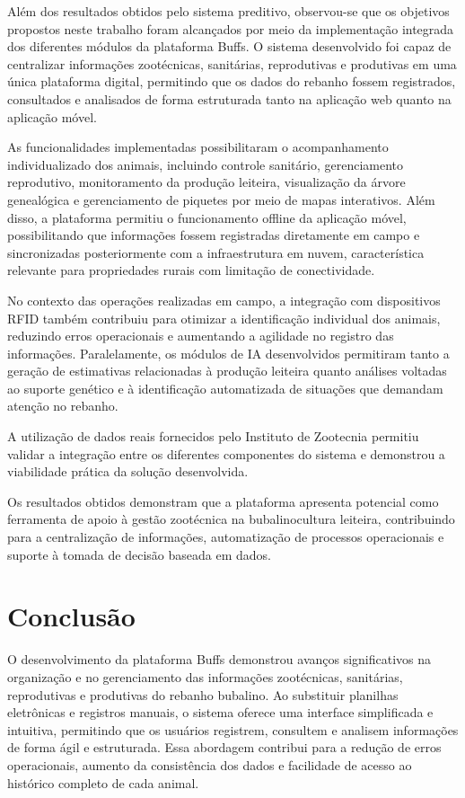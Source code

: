 \documentclass[11pt,a4paper]{article}
\begin{document}
Além dos resultados obtidos pelo sistema preditivo, observou-se que os objetivos propostos neste trabalho foram alcançados por meio da implementação integrada dos diferentes módulos da plataforma Buffs. O sistema desenvolvido foi capaz de centralizar informações zootécnicas, sanitárias, reprodutivas e produtivas em uma única plataforma digital, permitindo que os dados do rebanho fossem registrados, consultados e analisados de forma estruturada tanto na aplicação web quanto na aplicação móvel.

As funcionalidades implementadas possibilitaram o acompanhamento individualizado dos animais, incluindo controle sanitário, gerenciamento reprodutivo, monitoramento da produção leiteira, visualização da árvore genealógica e gerenciamento de piquetes por meio de mapas interativos. Além disso, a plataforma permitiu o funcionamento offline da aplicação móvel, possibilitando que informações fossem registradas diretamente em campo e sincronizadas posteriormente com a infraestrutura em nuvem, característica relevante para propriedades rurais com limitação de conectividade.

No contexto das operações realizadas em campo, a integração com dispositivos RFID também contribuiu para otimizar a identificação individual dos animais, reduzindo erros operacionais e aumentando a agilidade no registro das informações. Paralelamente, os módulos de IA desenvolvidos permitiram tanto a geração de estimativas relacionadas à produção leiteira quanto análises voltadas ao suporte genético e à identificação automatizada de situações que demandam atenção no rebanho.

A utilização de dados reais fornecidos pelo Instituto de Zootecnia permitiu validar a integração entre os diferentes componentes do sistema e demonstrou a viabilidade prática da solução desenvolvida.

Os resultados obtidos demonstram que a plataforma apresenta potencial como ferramenta de apoio à gestão zootécnica na bubalinocultura leiteira, contribuindo para a centralização de informações, automatização de processos operacionais e suporte à tomada de decisão baseada em dados.


\section{Conclusão}
O desenvolvimento da plataforma Buffs demonstrou avanços significativos na organização e no gerenciamento das informações zootécnicas, sanitárias, reprodutivas e produtivas do rebanho bubalino. Ao substituir planilhas eletrônicas e registros manuais, o sistema oferece uma interface simplificada e intuitiva, permitindo que os usuários registrem, consultem e analisem informações de forma ágil e estruturada. Essa abordagem contribui para a redução de erros operacionais, aumento da consistência dos dados e facilidade de acesso ao histórico completo de cada animal.
\end{document}
